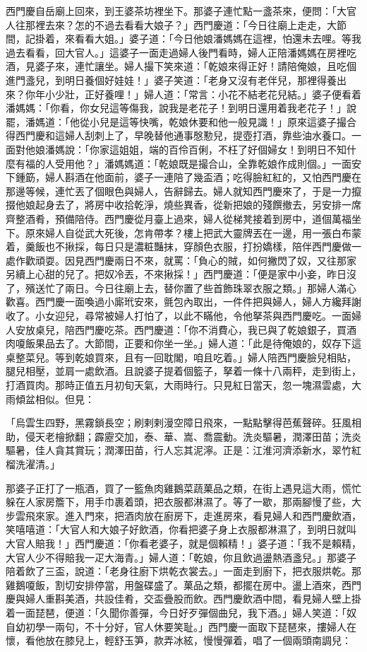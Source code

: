 西門慶自岳廟上回來，到王婆茶坊裡坐下。那婆子連忙點一盞茶來，便問：「大官人往那裡去來？怎的不過去看看大娘子？」西門慶道：「今日往廟上走走，大節間，記掛着，來看看大姐。」婆子道：「今日他娘潘媽媽在這裡，怕還未去哩。等我過去看看，回大官人。」這婆子一面走過婦人後門看時，婦人正陪潘媽媽在房裡吃酒，見婆子來，連忙讓坐。婦人撮下笑來道：「乾娘來得正好！請陪俺娘，且吃個進門盞兒，到明日養個好娃娃！」婆子笑道：「老身又沒有老伴兒，那裡得養出來？你年小少壯，正好養哩！」婦人道：「常言：小花不結老花兒結。」婆子便看着潘媽媽：「你看，你女兒這等傷我，說我是老花子！到明日還用着我老花子！」說罷，潘媽道：「他從小兒是這等快嘴，乾娘休要和他一般見識！」原來這婆子撮合得西門慶和這婦人刮刺上了，早晚替他通事慇懃兒，提壺打酒，靠些油水養口。一面對他娘潘媽說：「你家這姐姐，端的百伶百俐，不枉了好個婦女！到明日不知什麼有福的人受用他？」潘媽媽道：「乾娘既是撮合山，全靠乾娘作成則個。」一面安下鍾筯，婦人斟酒在他面前，婆子一連陪了幾盃酒；吃得臉紅紅的，又怕西門慶在那邊等候，連忙丟了個眼色與婦人，告辭歸去。婦人就知西門慶來了，于是一力攛掇他娘起身去了，將房中收拾乾淨，燒些異香，從新把娘的殘饌撤去，另安排一席齊整酒肴，預備陪侍。西門慶從月臺上過來，婦人從梯凳接着到房中，道個萬福坐下。原來婦人自從武大死後，怎肯帶孝？樓上把武大靈牌丟在一邊，用一張白布蒙着，羹飯也不揪採，每日只是濃粧豔抹，穿顏色衣服，打扮嬌樣，陪伴西門慶做一處作歡頑耍。因見西門慶兩日不來，就罵：「負心的賊，如何撇閃了奴，又往那家另續上心甜的兒了。把奴冷丟，不來揪採！」西門慶道：「便是家中小妾，昨日沒了，殯送忙了兩日。今日往廟上去，替你置了些首飾珠翠衣服之類。」那婦人滿心歡喜。西門慶一面喚過小廝玳安來，氈包內取出，一件件把與婦人，婦人方纔拜謝收了。小女迎兒，尋常被婦人打怕了，以此不瞞他，令他拏茶與西門慶吃。一面婦人安放桌兒，陪西門慶吃茶。西門慶道：「你不消費心，我已與了乾娘銀子，買酒肉嗄飯果品去了。大節間，正要和你坐一坐。」婦人道：「此是待俺娘的，奴存下這桌整菜兒。等到乾娘買來，且有一回耽閣，咱且吃着。」婦人陪西門慶臉兒相貼，腿兒相壓，並肩一處飲酒。且說婆子提着個籃子，拏着一條十八兩秤，走到街上，打酒買肉。那時正值五月初旬天氣，大雨時行。只見紅日當天，忽一塊濕雲處，大雨傾盆相似。但見：

「烏雲生四野，黑霧鎖長空；刷剌剌漫空障日飛來，一點點擊得芭蕉聲碎。狂風相助，侵天老檜掀翻；霹靂交加，泰、華、嵩、喬震動。洗炎驅暑，潤澤田苗；洗炎驅暑，佳人貪其賞玩；潤澤田苗，行人忘其泥濘。正是：江淮河濟添新水，翠竹紅榴洗濯清。」

那婆子正打了一瓶酒，買了一籃魚肉雞鵝菜蔬菓品之類，在街上遇見這大雨，慌忙躲在人家房簷下，用手巾裹着頭，把衣服都淋濕了。等了一歇，那兩腳慢了些，大步雲飛來家。進入門來，把酒肉放在廚房下，走進房來，看見婦人和西門慶飲酒，笑嘻嘻道：「大官人和大娘子好飲酒，你看把婆子身上衣服都淋濕了，到明日就叫大官人賠我！」西門慶道：「你看老婆子，就是個賴精！」婆子道：「我不是賴精，大官人少不得賠我一疋大海青。」婦人道：「乾娘，你且飲過盪熱酒盞兒。」那婆子陪着飲了三盃，說道：「老身往廚下烘乾衣裳去。」一面走到廚下，把衣服烘乾。那雞鵝嗄飯，割切安排停當，用盤碟盛了。菓品之類，都擺在房中。盪上酒來，西門慶與婦人重斟美酒，共設佳肴，交盃疊股而飲。西門慶飲酒中間，看見婦人壁上掛着一面琵琶，便道：「久聞你善彈，今日好歹彈個曲兒，我下酒。」婦人笑道：「奴自幼初學一兩句，不十分好，官人休要笑耻。」西門慶一面取下琵琶來，摟婦人在懷，看他放在膝兒上，輕舒玉笋，款弄冰絃，慢慢彈着，唱了一個兩頭南調兒：

